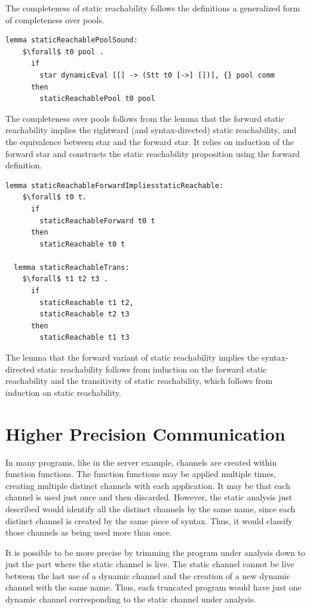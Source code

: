 \documentclass[letterpaper, 11pt]{extarticle}
\begin{document}
The completeness of static reachability follows the definitions
a generalized form of completeness over pools.

\begin{lstlisting}[language=logic, mathescape]
  lemma staticReachablePoolSound:
    $\forall$ t0 pool .
      if
        star dynamicEval [[] -> (Stt t0 [->] [])], {} pool comm 
      then
        staticReachablePool t0 pool
\end{lstlisting}

The completeness over pools follows from the lemma that the forward
static reachability implies the rightward (and syntax-directed) static reachability,
and the equivalence between star and the forward star.  It relies on induction of the
forward star and constructs the static reachability
proposition using the forward definition.  

\begin{lstlisting}[language=logic, mathescape]
  lemma staticReachableForwardImpliesstaticReachable:
    $\forall$ t0 t. 
      if
        staticReachableForward t0 t
      then
        staticReachable t0 t

  lemma staticReachableTrans:
    $\forall$ t1 t2 t3 .
      if 
        staticReachable t1 t2,
        staticReachable t2 t3
      then
        staticReachable t1 t3
\end{lstlisting}

The lemma that the forward variant of static reachability implies the syntax-directed static
reachability follows from induction on the forward static reachability and the
transitivity of static reachability, which follows from induction on static reachability.

\section{Higher Precision Communication}
In many programs, like in the server example, channels are created within function functions.
The function functions may be applied multiple times, creating multiple distinct channels
with each application. It may be that each channel is used just once and then discarded.
However, the static analysis just described would identify all the distinct channels by the
same name, since each distinct channel is created by the same piece of syntax.
Thus, it would classify those channels as being used more than once.

It is possible to be more precise by trimming the program under analysis down to just the part
where the static channel is live. The static channel cannot be live between the last use of a
dynamic channel and the creation of a new dynamic channel with the same name.  Thus, each
truncated program would have just one dynamic channel corresponding to the static channel under
analysis. 
\end{document}
